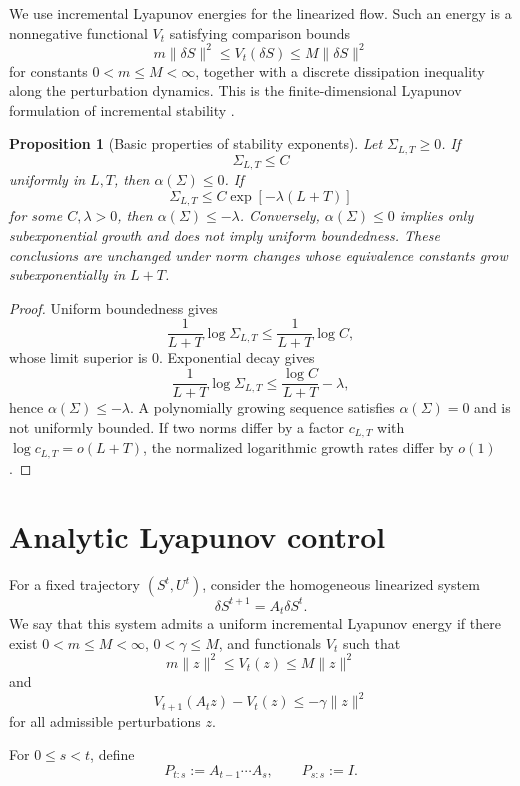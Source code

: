 \documentclass{article}
\newtheorem{proposition}[theorem]{Proposition}
\numberwithin{equation}{section}
\begin{document}
We use incremental Lyapunov energies for the linearized flow. Such an energy is
a nonnegative functional \(V_t\) satisfying comparison bounds
\[
m\|\delta S\|^2
\le
V_t(\delta S)
\le
M\|\delta S\|^2
\]
for constants \(0<m\le M<\infty\), together with a discrete dissipation
inequality along the perturbation dynamics. This is the finite-dimensional
Lyapunov formulation of incremental stability \cite{Khalil2002Nonlinear,Angeli2002Incremental}.

\begin{proposition}[Basic properties of stability exponents]
\label{prop:wellposed}
Let \(\Sigma_{L,T}\ge0\). If
\[
\Sigma_{L,T}\le C
\]
uniformly in \(L,T\), then \(\alpha(\Sigma)\le0\). If
\[
\Sigma_{L,T}\le C\exp[-\lambda(L+T)]
\]
for some \(C,\lambda>0\), then \(\alpha(\Sigma)\le-\lambda\). Conversely,
\(\alpha(\Sigma)\le0\) implies only subexponential growth and does not imply
uniform boundedness. These conclusions are unchanged under norm changes whose
equivalence constants grow subexponentially in \(L+T\).
\end{proposition}

\begin{proof}
Uniform boundedness gives
\[
\frac{1}{L+T}\log \Sigma_{L,T}
\le
\frac{1}{L+T}\log C,
\]
whose limit superior is \(0\). Exponential decay gives
\[
\frac{1}{L+T}\log \Sigma_{L,T}
\le
\frac{\log C}{L+T}-\lambda,
\]
hence \(\alpha(\Sigma)\le-\lambda\). A polynomially growing sequence satisfies
\(\alpha(\Sigma)=0\) and is not uniformly bounded. If two norms differ by a
factor \(c_{L,T}\) with \(\log c_{L,T}=o(L+T)\), the normalized logarithmic
growth rates differ by \(o(1)\).
\end{proof}

\section{Analytic Lyapunov control}
\label{sec:analytic-theorem}

For a fixed trajectory \((S^t,U^t)\), consider the homogeneous linearized system
\[
\delta S^{t+1}=A_t\delta S^t .
\]
We say that this system admits a uniform incremental Lyapunov energy if there
exist \(0<m\le M<\infty\), \(0<\gamma\le M\), and functionals \(V_t\) such that
\[
m\|z\|^2
\le
V_t(z)
\le
M\|z\|^2
\]
and
\[
V_{t+1}(A_tz)-V_t(z)
\le
-\gamma\|z\|^2
\]
for all admissible perturbations \(z\).

For \(0\le s<t\), define
\[
P_{t:s}:=A_{t-1}\cdots A_s,
\qquad
P_{s:s}:=I .
\]
\end{document}
